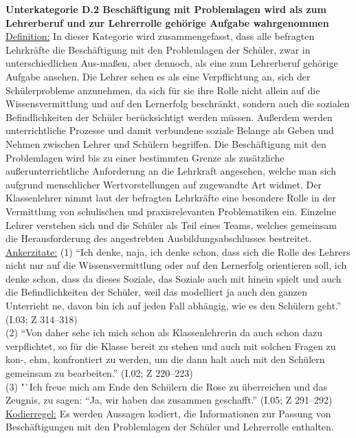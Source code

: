\textbf{Unterkategorie D.2 Beschäftigung mit Problemlagen wird als zum Lehrerberuf und zur Lehrerrolle gehörige Aufgabe wahrgenommen}\\
\underline{Definition:} In dieser Kategorie wird zusammengefasst, dass alle befragten Lehrkräfte die Beschäftigung mit den Problemlagen der Schüler, zwar in unterschiedlichen Aus-maßen, aber dennoch, als eine zum Lehrerberuf gehörige Aufgabe ansehen. Die Lehrer sehen es als eine Verpflichtung an, sich der Schülerprobleme anzunehmen, da sich für sie ihre Rolle nicht allein auf die Wissensvermittlung und auf den Lernerfolg beschränkt, sondern auch die sozialen Befindlichkeiten der Schüler berücksichtigt werden müssen. Außerdem werden unterrichtliche Prozesse und damit verbundene soziale Belange als Geben und Nehmen zwischen Lehrer und Schülern begriffen. Die Beschäftigung mit den Problemlagen wird bis zu einer bestimmten Grenze als zusätzliche außerunterrichtliche Anforderung an die Lehrkraft angesehen, welche man sich aufgrund menschlicher Wertvorstellungen auf zugewandte Art widmet. Der Klassenlehrer nimmt laut der befragten Lehrkräfte eine besondere Rolle in der Vermittlung von schulischen und praxisrelevanten Problematiken ein. Einzelne Lehrer verstehen sich und die Schüler als Teil eines Teams, welches gemeinsam die Herausforderung des angestrebten Ausbildungsabschlusses bestreitet.\\
\underline{Ankerzitate:} (1) "`Ich denke, naja, ich denke schon, dass sich die Rolle des Lehrers nicht nur auf die Wissensvermittlung oder auf den Lernerfolg orientieren soll, ich denke schon, dass da dieses Soziale, das Soziale auch mit hinein spielt und auch die Befindlichkeiten der Schüler, weil das modelliert ja auch den ganzen Unterricht ne, davon bin ich auf jeden Fall abhängig, wie es den Schülern geht."' (I.03; Z 314--318)\\ (2) "`Von daher sehe ich mich schon als Klassenlehrerin da auch schon dazu verpflichtet, so für die Klasse bereit zu stehen und auch mit solchen Fragen zu kon-, ehm, konfrontiert zu werden, um die dann halt auch mit den Schülern gemeinsam zu bearbeiten."' (I.02; Z 220--223)\\ (3) "`Ich freue mich am Ende den Schülern die Rose zu überreichen und das Zeugnis, zu sagen: "`Ja, wir haben das zusammen geschafft."' (I.05; Z 291--292)\\
\underline{Kodierregel:} Es werden Aussagen kodiert, die Informationen zur Passung von Beschäftigungen mit den Problemlagen der Schüler und Lehrerrolle enthalten.\\

